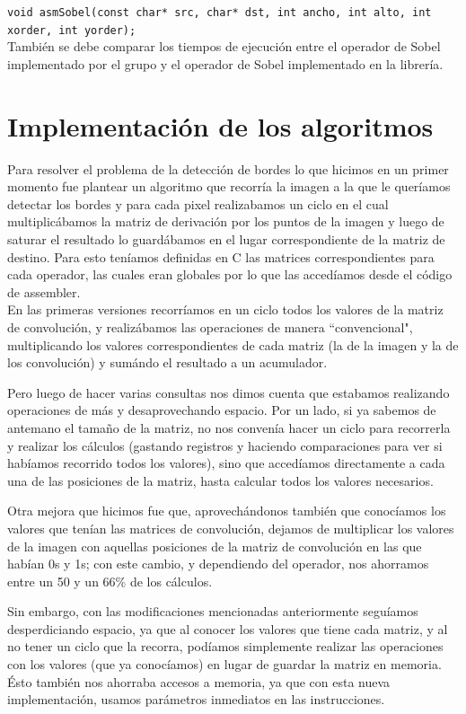 \documentclass[a4paper, 10pt]{article}
\begin{document}
\texttt{void asmSobel(const char* src, char* dst, int ancho, int alto, int xorder, int yorder);} \\

Tambi\'en se debe comparar los tiempos de ejecuci\'on entre el operador de Sobel implementado por el grupo y el operador de Sobel implementado en la librer\'ia.

\section{Implementaci\'on de los algoritmos}

Para resolver el problema de la detecci\'on de bordes lo que hicimos en un primer momento fue plantear un algoritmo que recorr\'ia la imagen a la que le quer\'iamos detectar los bordes y para cada pixel realizabamos un ciclo en el cual multiplic\'abamos la matriz de derivaci\'on por los puntos de la imagen y luego de saturar el resultado lo guard\'abamos en el lugar correspondiente de la matriz de destino. Para esto ten\'iamos definidas en C las matrices correspondientes para cada operador, las cuales eran globales por lo que las acced\'iamos desde el c\'odigo de assembler. \\ 

En las primeras versiones recorr\'iamos en un ciclo todos los valores de la matriz de convoluci\'on, y realiz\'abamos las operaciones de manera ``convencional", multiplicando los valores correspondientes de cada matriz (la de la imagen y la de los convoluci\'on) y sum\'ando el resultado a un acumulador. 

Pero luego de hacer varias consultas nos dimos cuenta que estabamos realizando operaciones de m\'as y desaprovechando espacio. Por un lado, si ya sabemos de antemano el tama\~{n}o de la matriz, no nos conven\'ia hacer un ciclo para recorrerla y realizar los c\'alculos (gastando registros y haciendo comparaciones para ver si hab\'iamos recorrido todos los valores), sino que acced\'iamos directamente a cada una de las posiciones de la matriz, hasta calcular todos los valores necesarios.

Otra mejora que hicimos fue que, aprovech\'andonos tambi\'en que conoc\'iamos los valores que ten\'ian las matrices de convoluci\'on, dejamos de multiplicar los valores de la imagen con aquellas posiciones de la matriz de convoluci\'on en las que hab\'ian 0s y 1s; con este cambio, y dependiendo del operador, nos ahorramos entre un 50 y un 66\% de los c\'alculos.

Sin embargo, con las modificaciones mencionadas anteriormente segu\'iamos desperdiciando espacio, ya que al conocer los valores que tiene cada matriz, y al no tener un ciclo que la recorra, pod\'iamos simplemente realizar las operaciones con los valores (que ya conoc\'iamos) en lugar de guardar la matriz en memoria. \'Esto tambi\'en nos ahorraba accesos a memoria, ya que con esta nueva implementaci\'on, usamos par\'ametros inmediatos en las instrucciones. \\
\end{document}

